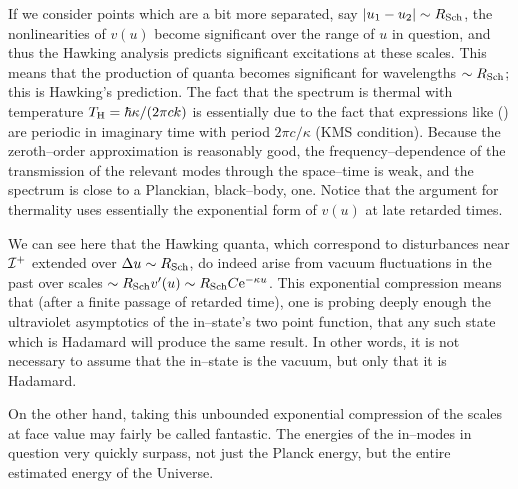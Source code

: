 If we consider points which are a bit more separated, say $|u_1-u_2|\sim R_{\rm
Sch}$, the nonlinearities of $v(u)$ become significant over the range of $u$ in
question, and thus the Hawking analysis predicts significant excitations at
these scales.  This means that the production of quanta becomes significant for
wavelengths $\sim R_{\rm Sch}$; this is Hawking's prediction.  The fact that
the spectrum is thermal with temperature $T_{\rm H}=\hbar\kappa /(2\pi ck)$ is
essentially due to the fact that expressions like (\renfun ) are periodic in
imaginary time with period $2\pi c/\kappa$ (KMS condition). Because the zeroth--order approximation is
reasonably good, the frequency--dependence of the transmission of the relevant
modes through the space--time is weak, and the spectrum is close to a
Planckian, black--body, one.  Notice that the argument for thermality uses
essentially the exponential form of $v(u)$ at late retarded times.

We can see here that the Hawking quanta, which correspond to disturbances near
${\cal I} ^+$ extended over $\Delta u\sim R_{\rm Sch}$, do indeed arise
from vacuum
fluctuations in the past over scales 
$\sim R_{\rm Sch}v'(u)\sim R_{\rm Sch}C\e^{-\kappa u}$.  
This exponential compression means that (after a finite passage of
retarded time), one is probing deeply enough the ultraviolet
asymptotics of the in--state's two point function, that any such state
which is Hadamard will produce the same result.  In other words, it is
not necessary to assume that the in--state is the vacuum, but only
that it is Hadamard.

On the other hand, taking this unbounded exponential compression of
the scales at face value may fairly be called fantastic.  The energies
of the in--modes in question very quickly surpass, not just the Planck
energy, but the entire estimated energy of the Universe.

